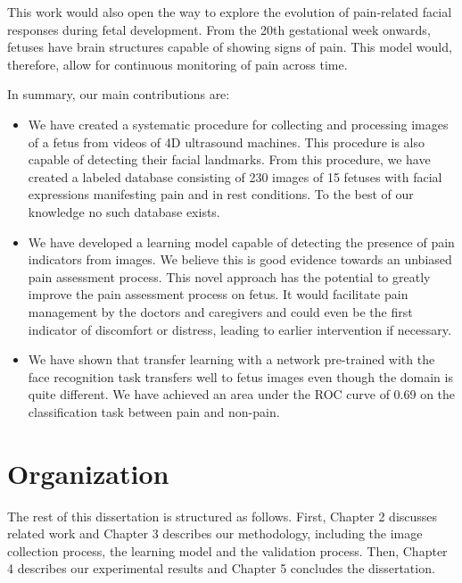 This work would also open the way to explore the evolution of pain-related facial responses during fetal development. From the 20th gestational week onwards, fetuses have brain structures capable of showing signs of pain. This model would, therefore, allow for continuous monitoring of pain across time.

In summary, our main contributions are:

\begin{itemize}
    \item We have created a systematic procedure for collecting and processing images of a fetus from videos of 4D ultrasound machines. This procedure is also capable of detecting their facial landmarks. From this procedure, we have created a labeled database consisting of 230 images of 15 fetuses with facial expressions manifesting pain and in rest conditions. To the best of our knowledge no such database exists.
    \item We have developed a learning model capable of detecting the presence of pain indicators from images. We believe this is good evidence towards an unbiased pain assessment process. This novel approach has the potential to greatly improve the pain assessment process on fetus. It would facilitate pain management by the doctors and caregivers and could even be the first indicator of discomfort or distress, leading to earlier intervention if necessary.
    \item We have shown that transfer learning with a network pre-trained with the face recognition task transfers well to fetus images even though the domain is quite different. We have achieved an area under the ROC curve of 0.69 on the classification task between pain and non-pain.
\end{itemize}

\section{Organization}

The rest of this dissertation is structured as follows. First, Chapter 2 discusses related work and Chapter 3 describes our methodology, including the image collection process, the learning model and the validation process. Then, Chapter 4 describes our experimental results and Chapter 5 concludes the dissertation.